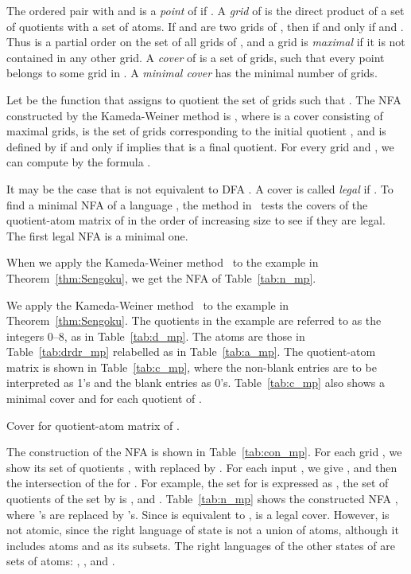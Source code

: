 \documentclass{llncs}
\begin{document}
The ordered pair  with  and  is a \emph{point} 
of  if .
A \emph{grid}  of  is the direct product  of a set  of quotients with a set  of atoms.
If  and  are two grids  of , 
then  if and only if  and .
Thus  is a partial order on the set of all grids of , 
and a grid is \emph{maximal} if it is not contained in any other grid.
A \emph{cover}  of  is a set  of grids,  
such that every point  belongs to some grid  in .
A \emph{minimal cover}  has the minimal number
of grids.

Let  be the function that assigns to quotient 
 the set of grids  such that .
The NFA constructed by the Kameda-Weiner method is , 
where  is a cover consisting of maximal grids, 
 is the set of grids corresponding to the initial quotient
, and  is defined by  if and only if  
implies that  is a final quotient.
For every grid  and , we can compute 
 by the formula .


It may be the case that  is not equivalent to DFA .
A cover  is called \emph{legal} if .
To find a minimal NFA of a language ,
the method in~\cite{KaWe70} 
tests the covers of the quotient-atom matrix of  in the order of 
increasing size to see if they are legal. 
The first legal NFA is a minimal one.

When we apply the Kameda-Weiner method~\cite{KaWe70} to the  example in 
Theorem~\ref{thm:Sengoku}, we get the NFA of Table~\ref{tab:n_mp}.


We apply the Kameda-Weiner method~\cite{KaWe70} to the  example in Theorem~\ref{thm:Sengoku}.
The quotients in the example are referred to as the integers 0--8, as in Table~\ref{tab:d_mp}.
The atoms are those in Table~\ref{tab:drdr_mp} relabelled as in Table~\ref{tab:a_mp}. 
The quotient-atom matrix is shown in Table~\ref{tab:c_mp}, where the non-blank entries are to be interpreted as 1's and the blank entries as 0's. 
Table~\ref{tab:c_mp} also shows a minimal cover  and  for each quotient  of .



\begin{table}[hbt]
\caption{Cover  for quotient-atom matrix of .}
\label{tab:c_mp}
\begin{center}

\end{center}
\end{table}


The construction of the NFA  is shown in Table~\ref{tab:con_mp}.
For each grid , we show its set of quotients , with
 replaced by .
For each input , we give , and then the intersection 
of the  for . 
For example, the set  for  is expressed as ,
the set of quotients  of the set  by  is , and 
.
Table~\ref{tab:n_mp} shows the constructed NFA , 
where 's are replaced by 's.
Since  is equivalent to ,   is a legal cover.
However,  is not atomic, since the right language of 
state  is not a union of atoms, although it includes atoms  and  as
its subsets. The right languages of the other states of  are sets of atoms:
, 
, and   
.
\end{document}
